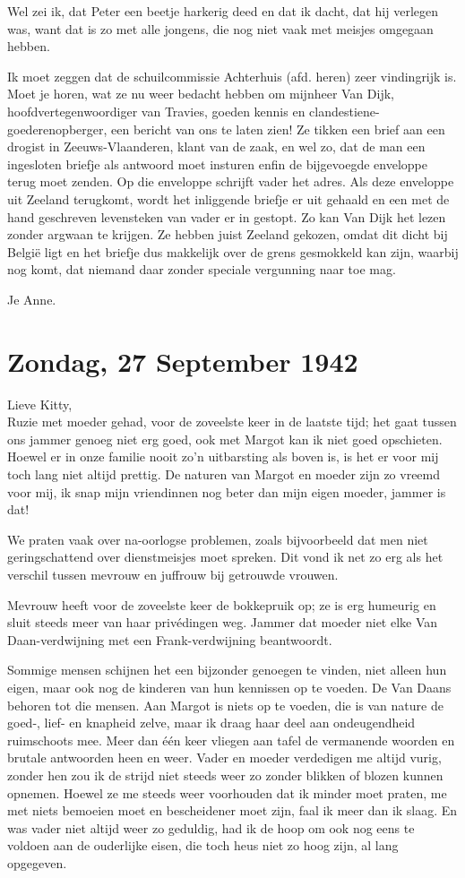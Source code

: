\documentclass{book}
\begin{document}
Wel zei ik, dat Peter een beetje harkerig deed en dat ik dacht, dat hij verlegen
was, want dat is zo met alle jongens, die nog niet vaak met meisjes omgegaan
hebben.

Ik moet zeggen dat de schuilcommissie Achterhuis (afd. heren) zeer vindingrijk
is. Moet je horen, wat ze nu weer bedacht hebben om mijnheer Van Dijk,
hoofdvertegenwoordiger van Travies, goeden kennis en
clandestiene-goederenopberger, een bericht van ons te laten zien! Ze tikken een
brief aan een drogist in Zeeuws-Vlaanderen, klant van de zaak, en wel zo, dat de
man een ingesloten briefje als antwoord moet insturen enfin de bijgevoegde
enveloppe terug moet zenden. Op die enveloppe schrijft vader het adres. Als deze
enveloppe uit Zeeland terugkomt, wordt het inliggende briefje er uit gehaald en
een met de hand geschreven levensteken van vader er in gestopt. Zo kan Van Dijk
het lezen zonder argwaan te krijgen. Ze hebben juist Zeeland gekozen, omdat dit
dicht bij België ligt en het briefje dus makkelijk over de grens gesmokkeld kan
zijn, waarbij nog komt, dat niemand daar zonder speciale vergunning naar toe
mag.

Je Anne.

\section*{Zondag, 27 September 1942}

Lieve Kitty,\\
Ruzie met moeder gehad, voor de zoveelste keer in de laatste
tijd; het gaat tussen ons jammer genoeg niet erg goed, ook met Margot kan ik
niet goed opschieten. Hoewel er in onze familie nooit zo'n uitbarsting als boven
is, is het er voor mij toch lang niet altijd prettig. De naturen van Margot en
moeder zijn zo vreemd voor mij, ik snap mijn vriendinnen nog beter dan mijn
eigen moeder, jammer is dat!

We praten vaak over na-oorlogse problemen, zoals bijvoorbeeld dat men niet
geringschattend over dienstmeisjes moet spreken. Dit vond ik net zo erg als het
verschil tussen mevrouw en juffrouw bij getrouwde vrouwen.

Mevrouw heeft voor de zoveelste keer de bokkepruik op; ze is erg humeurig en
sluit steeds meer van haar privédingen weg. Jammer dat moeder niet elke Van
Daan-verdwijning met een Frank-verdwijning beantwoordt.

Sommige mensen schijnen het een bijzonder genoegen te vinden, niet alleen hun
eigen, maar ook nog de kinderen van hun kennissen op te voeden. De Van Daans
behoren tot die mensen. Aan Margot is niets op te voeden, die is van nature de
goed-, lief- en knapheid zelve, maar ik draag haar deel aan ondeugendheid
ruimschoots mee. Meer dan één keer vliegen aan tafel de vermanende woorden en
brutale antwoorden heen en weer. Vader en moeder verdedigen me altijd vurig,
zonder hen zou ik de strijd niet steeds weer zo zonder blikken of blozen kunnen
opnemen.  Hoewel ze me steeds weer voorhouden dat ik minder moet praten, me met
niets bemoeien moet en bescheidener moet zijn, faal ik meer dan ik slaag. En was
vader niet altijd weer zo geduldig, had ik de hoop om ook nog eens te voldoen
aan de ouderlijke eisen, die toch heus niet zo hoog zijn, al lang opgegeven.
\end{document}
